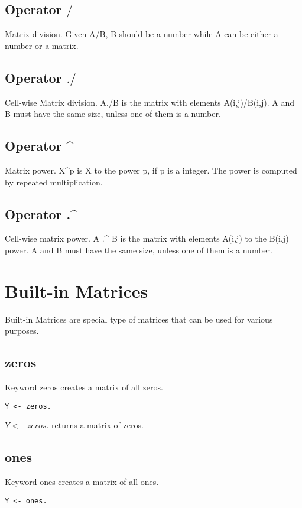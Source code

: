 \documentclass[prodmode,acmtecs]{acmsmall}
\begin{document}
\subsection{Operator $/$}
Matrix division. Given A/B, B should be a number while A can be either a
number or a matrix.
\medskip

\subsection{Operator $./$}
Cell-wise Matrix division. A./B is the matrix with elements A(i,j)/B(i,j).
A and B must have the same size, unless one of them is a number.
\medskip

\subsection{Operator \^{}}
Matrix power. X\^{}p is X to the power p, if p is a integer. The power
is computed by repeated multiplication.
\medskip

\subsection{Operator .\^{}}
Cell-wise matrix power. A .\^{} B is the matrix with elements A(i,j) to
the B(i,j) power. A and B must have the same size, unless one of them
is a number.

\section{Built-in Matrices}
Built-in Matrices are special type of matrices that can be used for
various purposes.
\medskip

\subsection{zeros}
Keyword zeros creates a matrix of all zeros.
\begin{lstlisting}
Y <- zeros.
\end{lstlisting}

$Y <- zeros.$ returns a matrix of zeros.
\medskip

\subsection{ones}
Keyword ones creates a matrix of all ones.
\begin{lstlisting}
Y <- ones.
\end{lstlisting}
\end{document}
